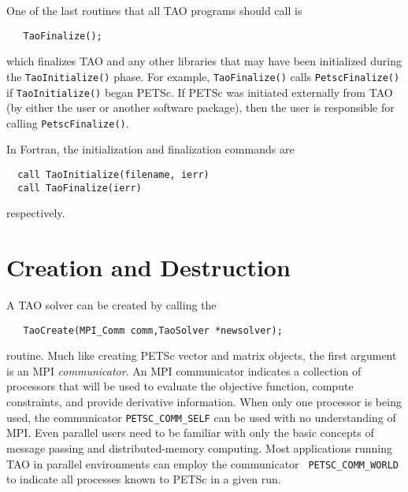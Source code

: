 One of the last routines that all TAO programs should 
call is 
\begin{verbatim}
   TaoFinalize();
\end{verbatim}
which finalizes TAO and any other libraries that may have been
initialized during the {\tt TaoInitialize()} phase.
For example, {\tt TaoFinalize()}
calls {\tt PetscFinalize()} 
if {\tt TaoInitialize()}
began PETSc. If PETSc was initiated externally from TAO (by either
the user or another software package), then the user is
responsible for calling {\tt PetscFinalize()}. 

In Fortran, the initialization and finalization commands are
\begin{verbatim}
  call TaoInitialize(filename, ierr)
  call TaoFinalize(ierr)
\end{verbatim}
respectively. 

\section{Creation and Destruction}

A TAO solver can be created by calling the
\begin{verbatim}
   TaoCreate(MPI_Comm comm,TaoSolver *newsolver);
\end{verbatim}
routine. 
Much like creating PETSc vector and matrix objects, 
the first argument is an MPI {\em communicator}.
An MPI \cite{using-mpi} communicator
indicates a collection of processors that will be used to evaluate the
objective function, compute constraints, and provide derivative information.
When only one processor is being used, the communicator {\tt PETSC\_COMM\_SELF}
can be used with no understanding of MPI.
Even parallel users need to be familiar with only the basic concepts 
of message passing and  distributed-memory computing. 
Most applications running TAO in
parallel environments can employ the communicator {\tt
PETSC\_COMM\_WORLD} to indicate all processes known to PETSc in a given run.

